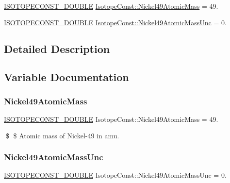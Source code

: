 \begin{DoxyCompactItemize}
\item 
\mbox{\hyperlink{group___isotope_const-_macros_ga8f45a7272ce02c0b4c65c44636ed719a}{I\+S\+O\+T\+O\+P\+E\+C\+O\+N\+S\+T\+\_\+\+D\+O\+U\+B\+LE}} \mbox{\hyperlink{group___isotope_const-_nickel-_ni49_ga763814e7bc5048b466b9df7511d90908}{Isotope\+Const\+::\+Nickel49\+Atomic\+Mass}} = 49.
\item 
\mbox{\hyperlink{group___isotope_const-_macros_ga8f45a7272ce02c0b4c65c44636ed719a}{I\+S\+O\+T\+O\+P\+E\+C\+O\+N\+S\+T\+\_\+\+D\+O\+U\+B\+LE}} \mbox{\hyperlink{group___isotope_const-_nickel-_ni49_gaf8560487c7668a8d3abc4f7701db6834}{Isotope\+Const\+::\+Nickel49\+Atomic\+Mass\+Unc}} = 0.
\end{DoxyCompactItemize}


\subsection{Detailed Description}


\subsection{Variable Documentation}
\mbox{\label{group___isotope_const-_nickel-_ni49_ga763814e7bc5048b466b9df7511d90908}} 
\subsubsection{\texorpdfstring{Nickel49\+Atomic\+Mass}{Nickel49AtomicMass}}
{\footnotesize\ttfamily \mbox{\hyperlink{group___isotope_const-_macros_ga8f45a7272ce02c0b4c65c44636ed719a}{I\+S\+O\+T\+O\+P\+E\+C\+O\+N\+S\+T\+\_\+\+D\+O\+U\+B\+LE}} Isotope\+Const\+::\+Nickel49\+Atomic\+Mass = 49.}

\$ \$ Atomic mass of Nickel-\/49 in amu. \mbox{\label{group___isotope_const-_nickel-_ni49_gaf8560487c7668a8d3abc4f7701db6834}} 
\subsubsection{\texorpdfstring{Nickel49\+Atomic\+Mass\+Unc}{Nickel49AtomicMassUnc}}
{\footnotesize\ttfamily \mbox{\hyperlink{group___isotope_const-_macros_ga8f45a7272ce02c0b4c65c44636ed719a}{I\+S\+O\+T\+O\+P\+E\+C\+O\+N\+S\+T\+\_\+\+D\+O\+U\+B\+LE}} Isotope\+Const\+::\+Nickel49\+Atomic\+Mass\+Unc = 0.}

